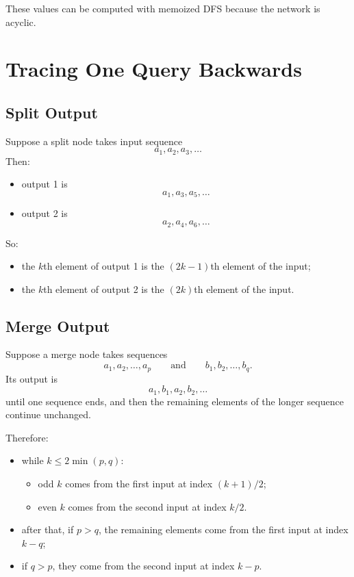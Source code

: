 \documentclass[11pt]{article}
\begin{document}
These values can be computed with memoized DFS because the network is acyclic.

\section*{Tracing One Query Backwards}

\subsection*{Split Output}

Suppose a split node takes input sequence
\[
    a_1,a_2,a_3,\dots
\]
Then:
\begin{itemize}[leftmargin=*]
    \item output 1 is
    \[
        a_1,a_3,a_5,\dots
    \]
    \item output 2 is
    \[
        a_2,a_4,a_6,\dots
    \]
\end{itemize}

So:
\begin{itemize}[leftmargin=*]
    \item the $k$th element of output 1 is the $(2k-1)$th element of the input;
    \item the $k$th element of output 2 is the $(2k)$th element of the input.
\end{itemize}

\subsection*{Merge Output}

Suppose a merge node takes sequences
\[
    a_1,a_2,\dots,a_p
    \qquad\text{and}\qquad
    b_1,b_2,\dots,b_q.
\]
Its output is
\[
    a_1,b_1,a_2,b_2,\dots
\]
until one sequence ends, and then the remaining elements of the longer sequence continue unchanged.

Therefore:
\begin{itemize}[leftmargin=*]
    \item while $k \le 2\min(p,q)$:
    \begin{itemize}[leftmargin=*]
        \item odd $k$ comes from the first input at index $(k+1)/2$;
        \item even $k$ comes from the second input at index $k/2$.
    \end{itemize}
    \item after that, if $p>q$, the remaining elements come from the first input at index $k-q$;
    \item if $q>p$, they come from the second input at index $k-p$.
\end{itemize}
\end{document}
